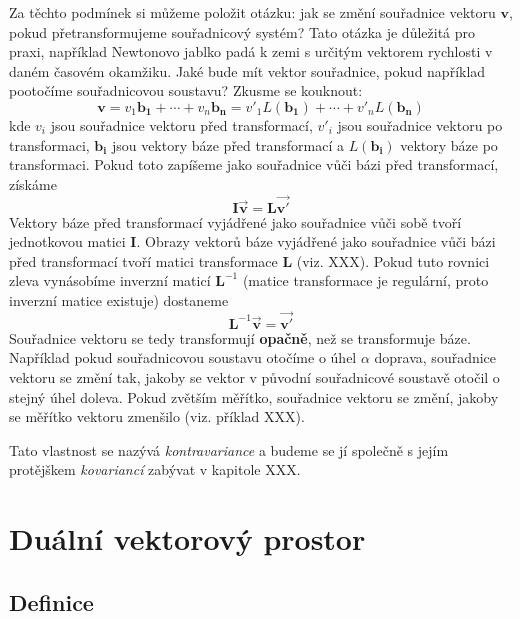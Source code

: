 \documentclass[a5paper,12pt]{amsbook}
\theoremstyle{definition}
\newcommand{\myscalar}[1]{#1}
\newcommand{\myvec}[1]{\mathbf{#1}}
\newcommand{\mycoord}[1]{\overrightarrow{\mathbf{#1}}}
\newcommand{\mymatrix}[1]{\mathbf{#1}}
\newcommand{\mymap}[1]{#1}
\begin{document}
Za těchto podmínek si můžeme položit otázku: jak se změní souřadnice vektoru $\myvec{v}$,
pokud přetransformujeme souřadnicový systém? Tato otázka je důležitá pro praxi, například
Newtonovo jablko padá k zemi s určitým vektorem rychlosti v daném časovém okamžiku. Jaké
bude mít vektor souřadnice, pokud například pootočíme souřadnicovou soustavu? Zkusme se
kouknout:
\begin{equation*}
\myvec{v} = \myscalar{v_1}\myvec{b_1} + \cdots + \myscalar{v_n}\myvec{b_n}
          = \myscalar{v'_1}\mymap{L}(\myvec{b_1}) + \cdots + \myscalar{v'_n}\mymap{L}(\myvec{b_n})
\end{equation*}
kde $\myscalar{v_i}$ jsou souřadnice vektoru před transformací, $\myscalar{v'_i}$ jsou souřadnice
vektoru po transformaci, $\myvec{b_i}$ jsou vektory báze před transformací a $\mymap{L}(\myvec{b_i})$
vektory báze po transformaci. Pokud toto zapíšeme jako souřadnice vůči bázi před transformací, získáme
\begin{equation*}
\mymatrix{I}\mycoord{v} = \mymatrix{L}\mycoord{v'}
\end{equation*}
Vektory báze před transformací vyjádřené jako souřadnice vůči sobě tvoří jednotkovou matici
$\mymatrix{I}$. Obrazy vektorů báze vyjádřené jako souřadnice vůči bázi před transformací
tvoří matici transformace $\mymatrix{L}$ (viz. XXX). Pokud tuto rovnici zleva vynásobíme
inverzní maticí $\mymatrix{L}^{-1}$ (matice transformace je regulární, proto inverzní
matice existuje) dostaneme
\begin{equation*}
\mymatrix{L}^{-1}\mycoord{v} = \mycoord{v'}
\end{equation*}
Souřadnice vektoru se tedy transformují \textbf{opačně}, než se transformuje báze.
Například pokud souřadnicovou soustavu otočíme o úhel $\alpha$ doprava, souřadnice vektoru
se změní tak, jakoby se vektor v původní souřadnicové soustavě otočil o stejný úhel doleva.
Pokud zvětším měřítko, souřadnice vektoru se změní, jakoby se měřítko vektoru zmenšilo (viz.
příklad XXX).

Tato vlastnost se nazývá \textit{kontravariance} a budeme se jí společně s jejím protějškem
\textit{kovariancí} zabývat v kapitole XXX.

\chapter{Duální vektorový prostor}

\section{Definice}
\end{document}
